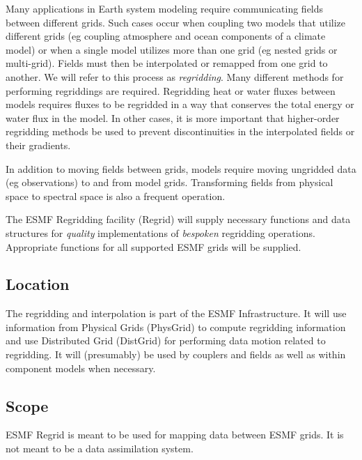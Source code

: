 
Many applications in Earth system modeling require
communicating fields between different grids.  Such
cases occur when coupling two models that utilize
different grids (eg coupling atmosphere and ocean
components of a climate model) or when a single model
utilizes more than one grid (eg nested grids or multi-grid).
Fields must then be interpolated or remapped
from one grid to another.  We will refer to this process
as {\em regridding}. Many different methods
for performing regriddings are required.
Regridding heat or water fluxes between models requires
fluxes to be regridded in a way that conserves
the total energy or water flux in the model.  In other
cases, it is more important that higher-order
regridding methods be used to prevent discontinuities
in the interpolated fields or their gradients.

In addition to moving fields between grids,
models require moving ungridded data (eg observations)
to and from model grids.  Transforming fields
from physical space to spectral space is also
a frequent operation.

The ESMF Regridding facility (Regrid) will
supply necessary functions and data structures for
{\em quality} implementations of {\em bespoken} regridding
operations.  Appropriate functions for all supported
ESMF grids will be supplied.

\subsection{Location}

The regridding and interpolation is part of the ESMF
Infrastructure.  It will use information from Physical
Grids (PhysGrid) to compute regridding information and
use Distributed Grid (DistGrid) for performing
data motion related to regridding.  It will (presumably)
be used by couplers and fields as well as within
component models when necessary.

\subsection{Scope}

ESMF Regrid is meant to be used for mapping data
between ESMF grids.  It is not meant to be a data
assimilation system.

